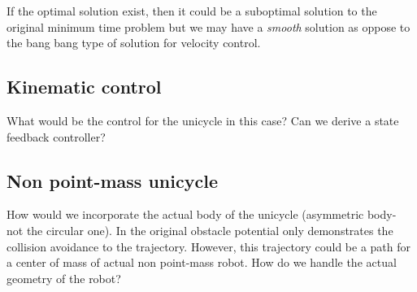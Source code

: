 \documentclass[letterpaper, 11 pt, onecolumn]{ieeeconf}  %
\theoremstyle{definition}
\begin{document}
If the optimal solution exist, then it could be a suboptimal solution to the original minimum time problem but we may have a \emph{smooth} solution as oppose to the bang bang type of solution for velocity control. 

\subsection{Kinematic control} 

What would be the control for the unicycle in this case? Can we derive a state feedback controller? 
\subsection{Non point-mass unicycle} 
How would we incorporate the actual body of the unicycle (asymmetric body- not the circular one). In the original obstacle potential only demonstrates the collision avoidance to the trajectory. However, this trajectory could be a path for a center of mass of actual non point-mass robot. How do we handle the actual geometry of the robot? 

%
%




\addtolength{\textheight}{-12cm}   %




%
%


%
%


\end{document}
